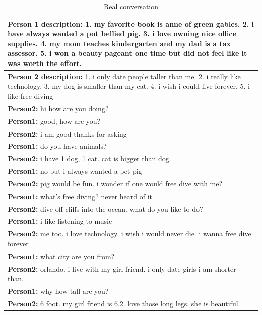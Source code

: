 \begin{table}[ht]
\centering
 \begin{tabular}{|p{14cm}|} 
 \hline\hline
 \textbf{Person 1 description:} 1. my favorite book is anne of green gables. 2. i have always wanted a pot bellied pig. 3. i love owning nice office supplies. 4. my mom teaches kindergarten and my dad is a tax assessor. 5. i won a beauty pageant one time but did not feel like it was worth the effort. \\
 \hline
 \textbf{Person 2 description:} 1. i only date people taller than me. 2. i really like technology. 3. my dog is smaller than my cat. 4. i wish i could live forever. 5. i like free diving \\
 \hline\hline
 \textbf{Person2:} hi how are you doing?  \\
 \textbf{Person1:} good, how are you? \\ 
 \textbf{Person2:} i am good thanks for asking \\
 \textbf{Person1:} do you have animals?\\
 \textbf{Person2:} i have 1 dog, 1 cat. cat is bigger than dog. \\
 \textbf{Person1:} no but i always wanted a pet pig \\
 \textbf{Person2:} pig would be fun. i wonder if one would free dive with me? \\
 \textbf{Person1:} what's free diving? never heard of it \\
 \textbf{Person2:} dive off cliffs into the ocean. what do you like to do? \\
 \textbf{Person1:} i like listening to music \\
 \textbf{Person2:} me too. i love technology. i wish i would never die. i wanna free dive forever \\
 \textbf{Person1:} what city are you from? \\
 \textbf{Person2:} orlando. i live with my girl friend. i only date girls i am shorter than. \\
 \textbf{Person1:} why how tall are you? \\
 \textbf{Person2:} 6 foot. my girl friend is 6.2. love those long legs. she is beautiful.\\
 \hline\hline
 \end{tabular}
 \caption{Real conversation}
\label{tab:real}
\end{table}


